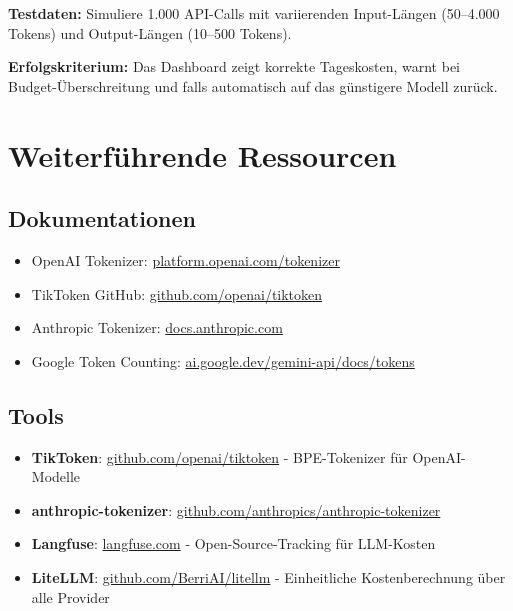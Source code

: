 \textbf{Testdaten:} Simuliere 1.000 API-Calls mit variierenden Input-Längen (50--4.000 Tokens) und Output-Längen (10--500 Tokens).

\textbf{Erfolgskriterium:} Das Dashboard zeigt korrekte Tageskosten, warnt bei Budget-Überschreitung und falls automatisch auf das günstigere Modell zurück.

\section{Weiterführende Ressourcen}

\subsection{Dokumentationen}

\begin{itemize}[leftmargin=*]
    \item OpenAI Tokenizer: \href{https://platform.openai.com/tokenizer}{platform.openai.com/tokenizer}
    \item TikToken GitHub: \href{https://github.com/openai/tiktoken}{github.com/openai/tiktoken}
    \item Anthropic Tokenizer: \href{https://docs.anthropic.com/en/docs/build-with-claude/token-counting}{docs.anthropic.com}
    \item Google Token Counting: \href{https://ai.google.dev/gemini-api/docs/tokens}{ai.google.dev/gemini-api/docs/tokens}
\end{itemize}

\subsection{Tools}

\begin{itemize}[leftmargin=*]
    \item \textbf{TikToken}: \href{https://github.com/openai/tiktoken}{github.com/openai/tiktoken} - BPE-Tokenizer für OpenAI-Modelle
    \item \textbf{anthropic-tokenizer}: \href{https://github.com/anthropics/anthropic-tokenizer}{github.com/anthropics/anthropic-tokenizer}
    \item \textbf{Langfuse}: \href{https://langfuse.com}{langfuse.com} - Open-Source-Tracking für LLM-Kosten
    \item \textbf{LiteLLM}: \href{https://github.com/BerriAI/litellm}{github.com/BerriAI/litellm} - Einheitliche Kostenberechnung über alle Provider
\end{itemize}

